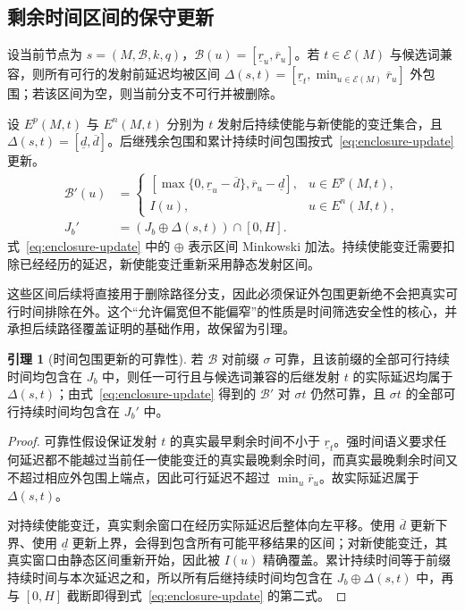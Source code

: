 \documentclass[master,fontset=ubuntu]{shnuthesis}
\theoremstyle{definition}
\newtheorem{thesislemma}{引理}
\begin{document}
\subsection{剩余时间区间的保守更新}

设当前节点为 \(s=(M,\mathcal B,k,q)\)，\(\mathcal B(u)=[\underline r_u,\overline r_u]\)。若 \(t\in\mathcal E(M)\) 与候选词兼容，则所有可行的发射前延迟均被区间 \(\Delta(s,t)=[\underline r_t,\min_{u\in\mathcal E(M)}\overline r_u]\) 外包围；若该区间为空，则当前分支不可行并被删除。

设 \(E^p(M,t)\) 与 \(E^n(M,t)\) 分别为 \(t\) 发射后持续使能与新使能的变迁集合，且 \(\Delta(s,t)=[\underline d,\overline d]\)。后继残余包围和累计持续时间包围按式~\eqref{eq:enclosure-update} 更新。
\begin{equation}
\begin{aligned}
\mathcal B'(u)
&=
\begin{cases}
[\max\{0,\underline r_u-\overline d\},
 \overline r_u-\underline d],
&u\in E^p(M,t),\\
I(u),
&u\in E^n(M,t),
\end{cases}\\
J_b'
&=
\left(
J_b\oplus\Delta(s,t)
\right)\cap[0,H].
\end{aligned}
\label{eq:enclosure-update}
\end{equation}
式~\eqref{eq:enclosure-update} 中的 \(\oplus\) 表示区间 Minkowski 加法。持续使能变迁需要扣除已经经历的延迟，新使能变迁重新采用静态发射区间。

这些区间后续将直接用于删除路径分支，因此必须保证外包围更新绝不会把真实可行时间排除在外。这个“允许偏宽但不能偏窄”的性质是时间筛选安全性的核心，并承担后续路径覆盖证明的基础作用，故保留为引理。

\begin{thesislemma}[时间包围更新的可靠性]
\label{lem:enclosure-soundness}
若 \(\mathcal B\) 对前缀 \(\sigma\) 可靠，且该前缀的全部可行持续时间均包含在 \(J_b\) 中，则任一可行且与候选词兼容的后继发射 \(t\) 的实际延迟均属于 \(\Delta(s,t)\)；由式~\eqref{eq:enclosure-update} 得到的 \(\mathcal B'\) 对 \(\sigma t\) 仍然可靠，且 \(\sigma t\) 的全部可行持续时间均包含在 \(J_b'\) 中。
\end{thesislemma}

\begin{proof}
可靠性假设保证发射 \(t\) 的真实最早剩余时间不小于 \(\underline r_t\)。强时间语义要求任何延迟都不能越过当前任一使能变迁的真实最晚剩余时间，而真实最晚剩余时间又不超过相应外包围上端点，因此可行延迟不超过 \(\min_u\overline r_u\)。故实际延迟属于 \(\Delta(s,t)\)。

对持续使能变迁，真实剩余窗口在经历实际延迟后整体向左平移。使用 \(\overline d\) 更新下界、使用 \(\underline d\) 更新上界，会得到包含所有可能平移结果的区间；对新使能变迁，其真实窗口由静态区间重新开始，因此被 \(I(u)\) 精确覆盖。累计持续时间等于前缀持续时间与本次延迟之和，所以所有后继持续时间均包含在 \(J_b\oplus\Delta(s,t)\) 中，再与 \([0,H]\) 截断即得到式~\eqref{eq:enclosure-update} 的第二式。
\end{proof}
\end{document}
